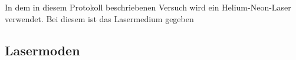 In dem in diesem Protokoll beschriebenen
Versuch wird ein Helium-Neon-Laser verwendet.
Bei diesem ist das Lasermedium gegeben






\subsection{Lasermoden}
\label{subsec:lasermoden}
